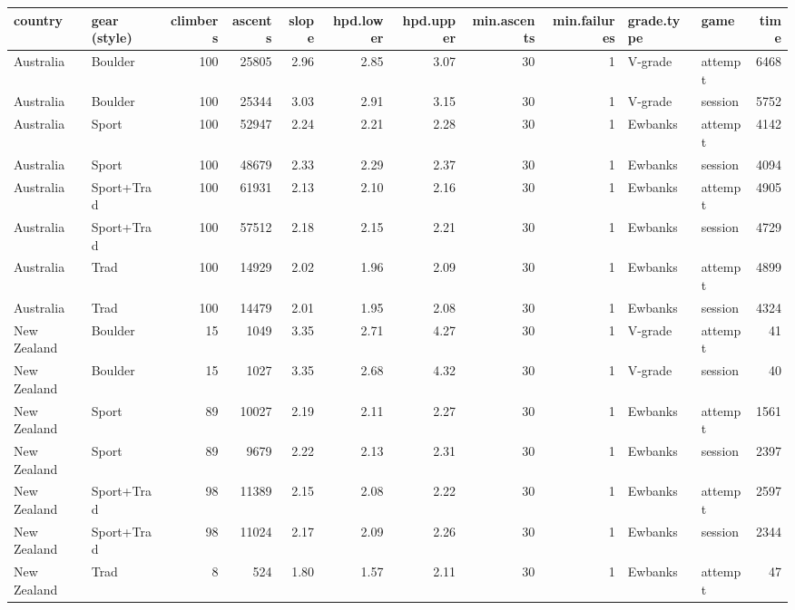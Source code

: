 \begin{table}[ht]
\centering
\fontsize{9pt}{10pt}\selectfont
\begin{tabular}{llrrrrrrrllr}
  \hline
{\bf country} & {\bf gear (style)} & {\bf climbers} & {\bf ascents} & {\bf slope} & {\bf hpd.lower} & {\bf hpd.upper} & {\bf min.ascents} & {\bf min.failures} & {\bf grade.type} & {\bf game} & {\bf time} \\ 
  \hline
Australia & Boulder & 100 & 25805 & 2.96 & 2.85 & 3.07 &  30 &   1 & V-grade & attempt & 6468 \\ 
  Australia & Boulder & 100 & 25344 & 3.03 & 2.91 & 3.15 &  30 &   1 & V-grade & session & 5752 \\ 
  Australia & Sport & 100 & 52947 & 2.24 & 2.21 & 2.28 &  30 &   1 & Ewbanks & attempt & 4142 \\ 
  Australia & Sport & 100 & 48679 & 2.33 & 2.29 & 2.37 &  30 &   1 & Ewbanks & session & 4094 \\ 
  Australia & Sport+Trad & 100 & 61931 & 2.13 & 2.10 & 2.16 &  30 &   1 & Ewbanks & attempt & 4905 \\ 
  Australia & Sport+Trad & 100 & 57512 & 2.18 & 2.15 & 2.21 &  30 &   1 & Ewbanks & session & 4729 \\ 
  Australia & Trad & 100 & 14929 & 2.02 & 1.96 & 2.09 &  30 &   1 & Ewbanks & attempt & 4899 \\ 
  Australia & Trad & 100 & 14479 & 2.01 & 1.95 & 2.08 &  30 &   1 & Ewbanks & session & 4324 \\ 
  New Zealand & Boulder &  15 & 1049 & 3.35 & 2.71 & 4.27 &  30 &   1 & V-grade & attempt &  41 \\ 
  New Zealand & Boulder &  15 & 1027 & 3.35 & 2.68 & 4.32 &  30 &   1 & V-grade & session &  40 \\ 
  New Zealand & Sport &  89 & 10027 & 2.19 & 2.11 & 2.27 &  30 &   1 & Ewbanks & attempt & 1561 \\ 
  New Zealand & Sport &  89 & 9679 & 2.22 & 2.13 & 2.31 &  30 &   1 & Ewbanks & session & 2397 \\ 
  New Zealand & Sport+Trad &  98 & 11389 & 2.15 & 2.08 & 2.22 &  30 &   1 & Ewbanks & attempt & 2597 \\ 
  New Zealand & Sport+Trad &  98 & 11024 & 2.17 & 2.09 & 2.26 &  30 &   1 & Ewbanks & session & 2344 \\ 
  New Zealand & Trad &   8 & 524 & 1.80 & 1.57 & 2.11 &  30 &   1 & Ewbanks & attempt &  47 \\ 

\end{tabular}
\end{table}
